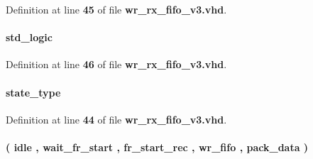 Definition at line {\bf 45} of file {\bf wr\+\_\+rx\+\_\+fifo\+\_\+v3.\+vhd}.

\paragraph[{iq\+\_\+sel\+\_\+int}]{ {\bfseries \textcolor{comment}{std\+\_\+logic}\textcolor{vhdlchar}{ }} \hspace{0.3cm}{\ttfamily [Signal]}}\label{classwr__rx__fifo__v3_1_1arch_a74e67e90d7089d193b6f35c46fbe0b48}


Definition at line {\bf 46} of file {\bf wr\+\_\+rx\+\_\+fifo\+\_\+v3.\+vhd}.

\paragraph[{next\+\_\+state}]{ {\bfseries {\bfseries {\bf state\+\_\+type}} \textcolor{vhdlchar}{ }} \hspace{0.3cm}{\ttfamily [Signal]}}\label{classwr__rx__fifo__v3_1_1arch_a7b92f98d060e763f3dd6fa727ddb03d8}


Definition at line {\bf 44} of file {\bf wr\+\_\+rx\+\_\+fifo\+\_\+v3.\+vhd}.

\paragraph[{state\+\_\+type}]{ {\bfseries \textcolor{vhdlchar}{(}\textcolor{vhdlchar}{ }\textcolor{vhdlchar}{idle}\textcolor{vhdlchar}{ }\textcolor{vhdlchar}{,}\textcolor{vhdlchar}{ }\textcolor{vhdlchar}{wait\+\_\+fr\+\_\+start}\textcolor{vhdlchar}{ }\textcolor{vhdlchar}{,}\textcolor{vhdlchar}{ }\textcolor{vhdlchar}{fr\+\_\+start\+\_\+rec}\textcolor{vhdlchar}{ }\textcolor{vhdlchar}{,}\textcolor{vhdlchar}{ }\textcolor{vhdlchar}{wr\+\_\+fifo}\textcolor{vhdlchar}{ }\textcolor{vhdlchar}{,}\textcolor{vhdlchar}{ }\textcolor{vhdlchar}{pack\+\_\+data}\textcolor{vhdlchar}{ }\textcolor{vhdlchar}{)}\textcolor{vhdlchar}{ }} \hspace{0.3cm}{\ttfamily [Type]}}\label{classwr__rx__fifo__v3_1_1arch_a59c620b7cbe37fbf2cec4074077fd851}



